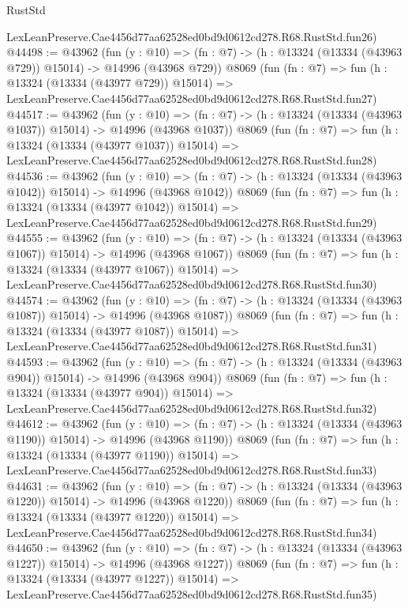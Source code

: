 \begin{lexlean}{RustStd}
\begin{coremodule}
    LexLeanPreserve.Cae4456d77aa62528ed0bd9d0612cd278.R68.RustStd.fun26)
@44498 := @43962
    (fun (y : @10) =>
    (fn : @7) -> (h : @13324 (@13334 (@43963 @729)) @15014) -> @14996 (@43968 @729))
    @8069
    (fun (fn : @7) =>
    fun (h : @13324 (@13334 (@43977 @729)) @15014) =>
    LexLeanPreserve.Cae4456d77aa62528ed0bd9d0612cd278.R68.RustStd.fun27)
@44517 := @43962
    (fun (y : @10) =>
    (fn : @7) -> (h : @13324 (@13334 (@43963 @1037)) @15014) -> @14996 (@43968 @1037))
    @8069
    (fun (fn : @7) =>
    fun (h : @13324 (@13334 (@43977 @1037)) @15014) =>
    LexLeanPreserve.Cae4456d77aa62528ed0bd9d0612cd278.R68.RustStd.fun28)
@44536 := @43962
    (fun (y : @10) =>
    (fn : @7) -> (h : @13324 (@13334 (@43963 @1042)) @15014) -> @14996 (@43968 @1042))
    @8069
    (fun (fn : @7) =>
    fun (h : @13324 (@13334 (@43977 @1042)) @15014) =>
    LexLeanPreserve.Cae4456d77aa62528ed0bd9d0612cd278.R68.RustStd.fun29)
@44555 := @43962
    (fun (y : @10) =>
    (fn : @7) -> (h : @13324 (@13334 (@43963 @1067)) @15014) -> @14996 (@43968 @1067))
    @8069
    (fun (fn : @7) =>
    fun (h : @13324 (@13334 (@43977 @1067)) @15014) =>
    LexLeanPreserve.Cae4456d77aa62528ed0bd9d0612cd278.R68.RustStd.fun30)
@44574 := @43962
    (fun (y : @10) =>
    (fn : @7) -> (h : @13324 (@13334 (@43963 @1087)) @15014) -> @14996 (@43968 @1087))
    @8069
    (fun (fn : @7) =>
    fun (h : @13324 (@13334 (@43977 @1087)) @15014) =>
    LexLeanPreserve.Cae4456d77aa62528ed0bd9d0612cd278.R68.RustStd.fun31)
@44593 := @43962
    (fun (y : @10) =>
    (fn : @7) -> (h : @13324 (@13334 (@43963 @904)) @15014) -> @14996 (@43968 @904))
    @8069
    (fun (fn : @7) =>
    fun (h : @13324 (@13334 (@43977 @904)) @15014) =>
    LexLeanPreserve.Cae4456d77aa62528ed0bd9d0612cd278.R68.RustStd.fun32)
@44612 := @43962
    (fun (y : @10) =>
    (fn : @7) -> (h : @13324 (@13334 (@43963 @1190)) @15014) -> @14996 (@43968 @1190))
    @8069
    (fun (fn : @7) =>
    fun (h : @13324 (@13334 (@43977 @1190)) @15014) =>
    LexLeanPreserve.Cae4456d77aa62528ed0bd9d0612cd278.R68.RustStd.fun33)
@44631 := @43962
    (fun (y : @10) =>
    (fn : @7) -> (h : @13324 (@13334 (@43963 @1220)) @15014) -> @14996 (@43968 @1220))
    @8069
    (fun (fn : @7) =>
    fun (h : @13324 (@13334 (@43977 @1220)) @15014) =>
    LexLeanPreserve.Cae4456d77aa62528ed0bd9d0612cd278.R68.RustStd.fun34)
@44650 := @43962
    (fun (y : @10) =>
    (fn : @7) -> (h : @13324 (@13334 (@43963 @1227)) @15014) -> @14996 (@43968 @1227))
    @8069
    (fun (fn : @7) =>
    fun (h : @13324 (@13334 (@43977 @1227)) @15014) =>
    LexLeanPreserve.Cae4456d77aa62528ed0bd9d0612cd278.R68.RustStd.fun35)

\end{coremodule}
\end{lexlean}
